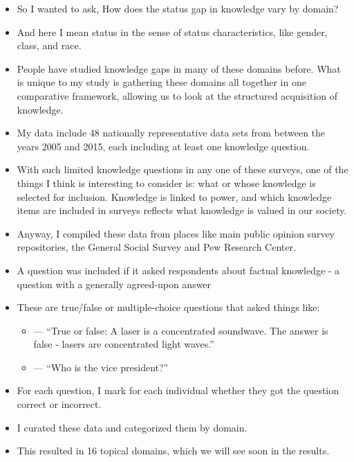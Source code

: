 \documentclass[]{article}
\begin{document}
\vspace{5mm}

\begin{itemize}
  \item{So I wanted to ask, How does the status gap in knowledge vary by domain?}
  \item{And here I mean status in the sense of status characteristics, like gender, class, and race.}
  \item{People have studied knowledge gaps in many of these domains before. What is unique to my study is gathering these domains all together in one comparative framework, allowing us to look at the structured acquisition of knowledge.}
\end{itemize}

\vspace{5mm}

\begin{itemize}
  \item{My data include 48 nationally representative data sets from between the years 2005 and 2015, each including at least one knowledge question.}
  \item{With such limited knowledge questions in any one of these surveys, one of the things I think is interesting to consider is: what or whose knowledge is selected for inclusion. Knowledge is linked to power, and which knowledge items are included in surveys reflects what knowledge is valued in our society.}
  \item{Anyway, I compiled these data from places like main public opinion survey repositories, the General Social Survey and Pew Research Center.}
  \item{A question was included if it asked respondents about factual knowledge  - a question with a generally agreed-upon answer}
  \item{These are true/false or multiple-choice questions that asked things like:}
    \begin{itemize}
      \item{--- ``True or false: A laser is a concentrated soundwave. The answer is false - lasers are concentrated light waves.''}
      \item{--- ``Who is the vice president?''}
    \end{itemize}
\end{itemize}

\begin{itemize}
  \item{For each question, I mark for each individual whether they got the question correct or incorrect.}
  \item{I curated these data and categorized them by domain.}
  \item{This resulted in 16 topical domains, which we will see soon in the results.}
\end{itemize}
\end{document}
